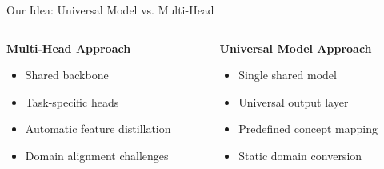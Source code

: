 \documentclass[aspectratio=169]{beamer}
\begin{document}
\begin{frame}{Our Idea: Universal Model vs. Multi-Head}
    \begin{columns}[T]
        \begin{column}{0.48\textwidth}
            \textbf{Multi-Head Approach}
            \begin{itemize}
                \item Shared backbone
                \item Task-specific heads
                \item Automatic feature distillation
                \item Domain alignment challenges
            \end{itemize}

            \begin{center}
            \end{center}
        \end{column}

        \begin{column}{0.48\textwidth}
            \textbf{Universal Model Approach}
            \begin{itemize}
                \item Single shared model
                \item Universal output layer
                \item Predefined concept mapping
                \item Static domain conversion
            \end{itemize}

            \begin{center}
\end{center}
\end{column}
\end{columns}
\end{frame}
\end{document}
